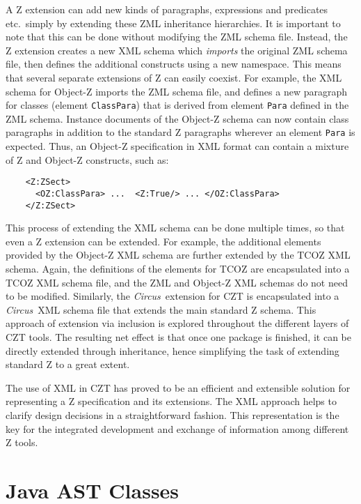 \documentclass{llncs}
\newcommand{\Circus}{{\sf\slshape Circus}}
\newcommand{\Element}[1]{\texttt{#1}}
\begin{document}
  A Z extension can add new kinds of paragraphs, expressions and predicates
  etc.~simply by extending these ZML inheritance hierarchies.  It is
  important to note that this can be done without modifying the
  ZML schema file.  Instead, the Z extension creates a new XML schema
  which \emph{imports} the original ZML schema file, then defines the
  additional constructs using a new namespace.
  This means that several separate extensions of Z can easily coexist.
  For example, the XML schema for Object-Z imports
  the ZML schema file, and defines a new paragraph for classes (element
  \Element{ClassPara}) that is derived from element \Element{Para}
  defined in the ZML schema.  Instance documents of the Object-Z
  schema can now contain class paragraphs in addition to the standard Z
  paragraphs wherever an element \Element{Para} is expected.  Thus,
  an Object-Z specification in XML format can contain a mixture of
  Z and Object-Z constructs, such as:
\begin{small}
\begin{verbatim}
    <Z:ZSect>
      <OZ:ClassPara> ...  <Z:True/> ... </OZ:ClassPara>
    </Z:ZSect>
\end{verbatim}
\end{small}

  This process of extending the XML schema can be done multiple times, so
  that even a Z extension can be extended.  For example, the
  additional elements provided by the Object-Z XML schema are further
  extended by the TCOZ XML schema.  Again, the definitions of the elements
  for TCOZ are encapsulated into a TCOZ XML schema file, and the ZML and
  Object-Z XML schemas do not need to be modified.
  Similarly, the \Circus\ extension for CZT is encapsulated into a
  \Circus\ XML schema file that extends the main standard Z schema.
  This approach of extension via inclusion is explored throughout the
  different layers of CZT tools.
  The resulting net effect is that once one package is finished, it
  can be directly extended through inheritance, hence simplifying the
  task of extending standard Z to a great extent.

  The use of XML in CZT has proved to be an efficient and extensible
  solution for representing a Z specification and its extensions.  The
  XML approach helps to clarify design decisions in a straightforward
  fashion.  This representation is the key for the integrated
  development and exchange of information among different Z tools.

\section{Java AST Classes}\label{java-ast-classes}
\end{document}
